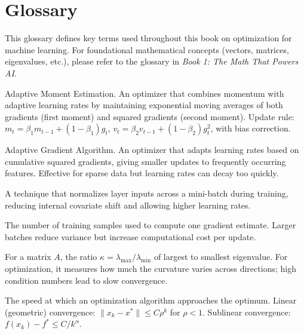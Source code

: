 \documentclass[../main.tex]{subfiles}
\begin{document}
\chapter*{Glossary}
\label{app:glossary}

This glossary defines key terms used throughout this book on optimization for machine learning. For foundational mathematical concepts (vectors, matrices, eigenvalues, etc.), please refer to the glossary in \emph{Book 1: The Math That Powers AI}.

\bigskip

\begin{description}[style=nextline, leftmargin=2cm, labelwidth=1.8cm]

\item[Adam]
Adaptive Moment Estimation. An optimizer that combines momentum with adaptive learning rates by maintaining exponential moving averages of both gradients (first moment) and squared gradients (second moment). Update rule: $m_t = \beta_1 m_{t-1} + (1-\beta_1)g_t$, $v_t = \beta_2 v_{t-1} + (1-\beta_2)g_t^2$, with bias correction.

\item[AdaGrad]
Adaptive Gradient Algorithm. An optimizer that adapts learning rates based on cumulative squared gradients, giving smaller updates to frequently occurring features. Effective for sparse data but learning rates can decay too quickly.

\item[Batch Normalization]
A technique that normalizes layer inputs across a mini-batch during training, reducing internal covariate shift and allowing higher learning rates.

\item[Batch Size]
The number of training samples used to compute one gradient estimate. Larger batches reduce variance but increase computational cost per update.

\item[Condition Number]
For a matrix $A$, the ratio $\kappa = \lambda_{\max}/\lambda_{\min}$ of largest to smallest eigenvalue. For optimization, it measures how much the curvature varies across directions; high condition numbers lead to slow convergence.

\item[Convergence Rate]
The speed at which an optimization algorithm approaches the optimum. Linear (geometric) convergence: $\|x_k - x^*\| \leq C\rho^k$ for $\rho < 1$. Sublinear convergence: $f(x_k) - f^* \leq C/k^\alpha$.


\end{description}
\end{document}
